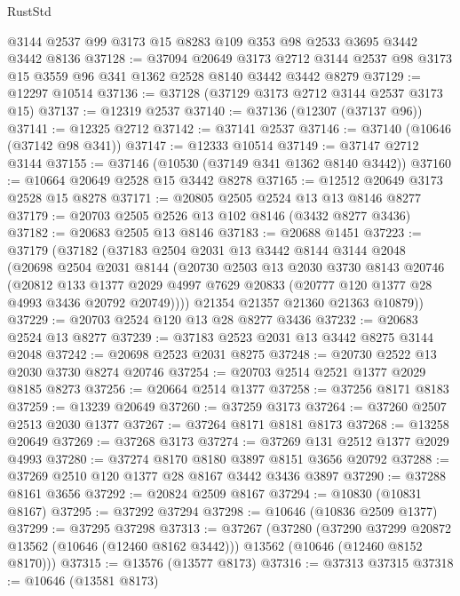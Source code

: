 \begin{lexlean}{RustStd}
\begin{coremodule}
    @3144
    @2537
    @99
    @3173
    @15
    @8283
    @109
    @353
    @98
    @2533
    @3695
    @3442
    @3442
    @8136
@37128 := @37094
    @20649
    @3173
    @2712
    @3144
    @2537
    @98
    @3173
    @15
    @3559
    @96
    @341
    @1362
    @2528
    @8140
    @3442
    @3442
    @8279
@37129 := @12297 @10514
@37136 := @37128 (@37129 @3173 @2712 @3144 @2537 @3173 @15)
@37137 := @12319 @2537
@37140 := @37136 (@12307 (@37137 @96))
@37141 := @12325 @2712
@37142 := @37141 @2537
@37146 := @37140 (@10646 (@37142 @98 @341))
@37147 := @12333 @10514
@37149 := @37147 @2712 @3144
@37155 := @37146 (@10530 (@37149 @341 @1362 @8140 @3442))
@37160 := @10664 @20649 @2528 @15 @3442 @8278
@37165 := @12512 @20649 @3173 @2528 @15 @8278
@37171 := @20805 @2505 @2524 @13 @13 @8146 @8277
@37179 := @20703 @2505 @2526 @13 @102 @8146 (@3432 @8277 @3436)
@37182 := @20683 @2505 @13 @8146
@37183 := @20688 @1451
@37223 := @37179
    (@37182
      (@37183
        @2504
        @2031
        @13
        @3442
        @8144
        @3144
        @2048
        (@20698
          @2504
          @2031
          @8144
          (@20730
            @2503
            @13
            @2030
            @3730
            @8143
            @20746
            (@20812
              @133
              @1377
              @2029
              @4997
              @7629
              @20833
              (@20777 @120 @1377 @28 @4993 @3436 @20792 @20749))))
        @21354
        @21357
        @21360
        @21363
        @10879))
@37229 := @20703 @2524 @120 @13 @28 @8277 @3436
@37232 := @20683 @2524 @13 @8277
@37239 := @37183 @2523 @2031 @13 @3442 @8275 @3144 @2048
@37242 := @20698 @2523 @2031 @8275
@37248 := @20730 @2522 @13 @2030 @3730 @8274 @20746
@37254 := @20703 @2514 @2521 @1377 @2029 @8185 @8273
@37256 := @20664 @2514 @1377
@37258 := @37256 @8171 @8183
@37259 := @13239 @20649
@37260 := @37259 @3173
@37264 := @37260 @2507 @2513 @2030 @1377
@37267 := @37264 @8171 @8181 @8173
@37268 := @13258 @20649
@37269 := @37268 @3173
@37274 := @37269 @131 @2512 @1377 @2029 @4993
@37280 := @37274 @8170 @8180 @3897 @8151 @3656 @20792
@37288 := @37269 @2510 @120 @1377 @28 @8167 @3442 @3436 @3897
@37290 := @37288 @8161 @3656
@37292 := @20824 @2509 @8167
@37294 := @10830 (@10831 @8167)
@37295 := @37292 @37294
@37298 := @10646 (@10836 @2509 @1377)
@37299 := @37295 @37298
@37313 := @37267
    (@37280
      (@37290 @37299 @20872 @13562 (@10646 (@12460 @8162 @3442)))
      @13562
      (@10646 (@12460 @8152 @8170)))
@37315 := @13576 (@13577 @8173)
@37316 := @37313 @37315
@37318 := @10646 (@13581 @8173)

\end{coremodule}
\end{lexlean}
